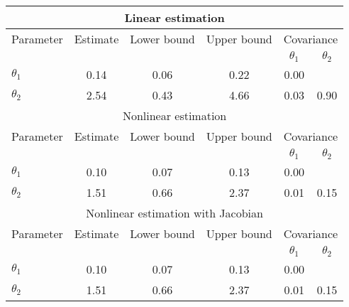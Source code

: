 \begin{tabular}{l|ccc|cc} \hline \hline 
\multicolumn{6}{c}{Linear estimation} \\ \hline \hline
Parameter & Estimate & Lower bound & Upper bound & \multicolumn{2}{c}{Covariance}  \\& & & & $\theta_1$ & $\theta_2$ \\ \hline 
$\theta_1$ & 0.14 & 0.06 & 0.22 & 0.00 & \\ 
$\theta_2$ & 2.54 & 0.43 & 4.66 & 0.03 & 0.90 \\ 
\hline \hline 
\multicolumn{6}{c}{Nonlinear estimation} \\ \hline \hline
Parameter & Estimate & Lower bound & Upper bound & \multicolumn{2}{c}{Covariance}  \\& & & & $\theta_1$ & $\theta_2$ \\ \hline 
$\theta_1$ & 0.10 & 0.07 & 0.13 & 0.00 & \\ 
$\theta_2$ & 1.51 & 0.66 & 2.37 & 0.01 & 0.15 \\ 
\hline \hline 
\multicolumn{6}{c}{Nonlinear estimation with Jacobian} \\ \hline \hline
Parameter & Estimate & Lower bound & Upper bound & \multicolumn{2}{c}{Covariance}  \\& & & & $\theta_1$ & $\theta_2$ \\ \hline 
$\theta_1$ & 0.10 & 0.07 & 0.13 & 0.00 & \\ 
$\theta_2$ & 1.51 & 0.66 & 2.37 & 0.01 & 0.15 \\ 
\hline \hline 
\end{tabular} 
